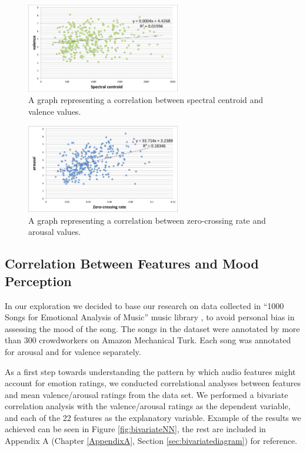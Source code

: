 \begin{figure}[h]
	\centering
   \includegraphics[width=0.6\textwidth]{Figures/spectralcentroid-valence}
\caption{A graph representing a correlation between spectral centroid and valence values.}
\label{fig:bivariate-valence}
\end{figure}


\begin{figure}[h]
	\centering
   \includegraphics[width=0.6\textwidth]{Figures/zerocrossing-arousal}
 \caption{A graph representing a correlation between zero-crossing rate and arousal values.}
\label{fig:bivariate-arousal}
\end{figure}


\vspace{10pt}

\subsection{Correlation Between Features and Mood Perception}

In our exploration we decided to base our research on data collected in ``1000 Songs for Emotional Analysis of Music'' music library \cite{1000songs}, to avoid personal bias in assessing the mood of the song. The songs in the dataset were annotated by more than 300 crowdworkers on Amazon Mechanical Turk. Each song was annotated for arousal and for valence separately.

As a first step towards understanding the pattern by which audio features might account for emotion ratings, we conducted correlational analyses between features and mean valence/arousal ratings from the data set. We performed a bivariate correlation analysis with the valence/arousal ratings as the dependent variable, and each of the 22 features as the explanatory variable. Example of the results we achieved can be seen in Figure \ref{fig:bivariateNN}, the rest are included in Appendix A (Chapter \ref{AppendixA}, Section \ref{sec:bivariatediagram}) for reference. 

